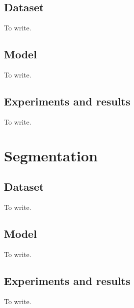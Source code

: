 \section{Dataset}
To write.

\section{Model}
To write.

\section{Experiments and results}
To write.



\chapter{Segmentation}

\section{Dataset}
To write.

\section{Model}
To write.

\section{Experiments and results}
To write.


